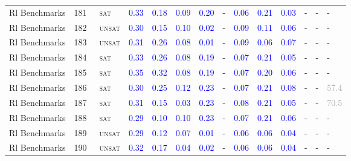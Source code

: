 \begin{center}
{\begin{longtable}{@{}llllllllllllll@{}}
Rl Benchmarks & 181 & ~\textsc{sat} & \textcolor{blue}{0.33} & \textcolor{blue}{0.18} & \textcolor{blue}{0.09} & \textcolor{blue}{0.20} & - & \textcolor{blue}{0.06} & \textcolor{blue}{0.21} & \textcolor{blue}{0.03} & - & - & - \\
Rl Benchmarks & 182 & ~\textsc{unsat} & \textcolor{blue}{0.30} & \textcolor{blue}{0.15} & \textcolor{blue}{0.10} & \textcolor{blue}{0.02} & - & \textcolor{blue}{0.09} & \textcolor{blue}{0.11} & \textcolor{blue}{0.06} & - & - & - \\
Rl Benchmarks & 183 & ~\textsc{unsat} & \textcolor{blue}{0.31} & \textcolor{blue}{0.26} & \textcolor{blue}{0.08} & \textcolor{blue}{0.01} & - & \textcolor{blue}{0.09} & \textcolor{blue}{0.06} & \textcolor{blue}{0.07} & - & - & - \\
Rl Benchmarks & 184 & ~\textsc{sat} & \textcolor{blue}{0.33} & \textcolor{blue}{0.26} & \textcolor{blue}{0.08} & \textcolor{blue}{0.19} & - & \textcolor{blue}{0.07} & \textcolor{blue}{0.21} & \textcolor{blue}{0.05} & - & - & - \\
Rl Benchmarks & 185 & ~\textsc{sat} & \textcolor{blue}{0.35} & \textcolor{blue}{0.32} & \textcolor{blue}{0.08} & \textcolor{blue}{0.19} & - & \textcolor{blue}{0.07} & \textcolor{blue}{0.20} & \textcolor{blue}{0.06} & - & - & - \\
Rl Benchmarks & 186 & ~\textsc{sat} & \textcolor{blue}{0.30} & \textcolor{blue}{0.25} & \textcolor{blue}{0.12} & \textcolor{blue}{0.23} & - & \textcolor{blue}{0.07} & \textcolor{blue}{0.21} & \textcolor{blue}{0.08} & - & - & \textcolor{darkgray}{57.4} \\
Rl Benchmarks & 187 & ~\textsc{sat} & \textcolor{blue}{0.31} & \textcolor{blue}{0.15} & \textcolor{blue}{0.03} & \textcolor{blue}{0.23} & - & \textcolor{blue}{0.08} & \textcolor{blue}{0.21} & \textcolor{blue}{0.05} & - & - & \textcolor{darkgray}{70.5} \\
Rl Benchmarks & 188 & ~\textsc{sat} & \textcolor{blue}{0.29} & \textcolor{blue}{0.10} & \textcolor{blue}{0.10} & \textcolor{blue}{0.23} & - & \textcolor{blue}{0.07} & \textcolor{blue}{0.21} & \textcolor{blue}{0.06} & - & - & - \\
Rl Benchmarks & 189 & ~\textsc{unsat} & \textcolor{blue}{0.29} & \textcolor{blue}{0.12} & \textcolor{blue}{0.07} & \textcolor{blue}{0.01} & - & \textcolor{blue}{0.06} & \textcolor{blue}{0.06} & \textcolor{blue}{0.04} & - & - & - \\
Rl Benchmarks & 190 & ~\textsc{unsat} & \textcolor{blue}{0.32} & \textcolor{blue}{0.17} & \textcolor{blue}{0.04} & \textcolor{blue}{0.02} & - & \textcolor{blue}{0.06} & \textcolor{blue}{0.06} & \textcolor{blue}{0.04} & - & - & - \\

\end{longtable}}
\end{center}
